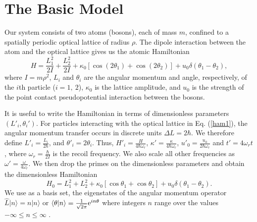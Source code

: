 \documentclass{article}
\begin{document}
%
%
\section{The Basic Model}
\label{sec:basicmodel}
%
%

Our system consists of two  atoms (bosons), each  of mass $m$, confined to a spatially periodic  optical lattice of radius $\rho$.  The dipole interaction between the atom and the optical lattice gives us the  atomic Hamiltonian
%
\begin{equation}
H=\frac{L_1^2}{2I}+\frac{L_2^2}{2I}+\kappa_0 [ \cos{(2{\theta}_1)} + \cos{(2{\theta}_2)}]+u_0 \delta({\theta}_1-{\theta}_2),
\label{ham1}
\end{equation}
%
where $I=m{\rho}^2$, $L_i$ and ${\theta}_i$ are the angular momentum and angle, respectively,  of the $i$th particle ($i=1,~2$), $\kappa_0$ is the lattice amplitude, and $u_0$ is the strength of the point contact pseudopotential interaction between the bosons. 

It is useful to write the Hamiltonian in terms of dimensionless parameters $(L'_i, {\theta}_i')$. For particles interacting with the optical lattice in Eq. (\ref{ham1}), the angular momentum transfer  occurs in discrete units ${\Delta}L=2{\hbar}$. We therefore define $L'_i=\frac{L_i}{2\hbar }$, and ${\theta}'_i=2 {\theta}_i$. Thus, $H'_i=\frac{H}{4\hbar\omega_r}$, $\kappa'=\frac{\kappa}{4\hbar\omega_r}$, $u'_0=\frac{u_0 }{2\hbar\omega_r}$ and $t'=4\omega_r t$, where $\omega_r=\frac{\hbar }{2I}$ is the recoil frequency. We also scale all other frequencies as $\omega'=\frac{\omega}{4\omega_r}$. We  then drop the primes on the dimensionless parameters and obtain the dimensionless Hamiltonian 
%
\begin{equation}
H_0=L^2_1 + L^2_2+\kappa_0 [ \cos{{\theta}_1}+ \cos{{\theta}_2}] + u_0 \delta({\theta}_1-{\theta}_2).
\label{eq:hamscale}
\end{equation}
%
We use as a basis set, the eigenstates of the angular momentum operator 
${\hat L}|n{\rangle}=n{|n \rangle}$ or ${\langle}{\theta}|n{\rangle}=\frac{1}{\sqrt{2\pi}}{\rm e}^{in{\theta}}$ where integers $n$ range over the values $-\infty{\leq}n{\leq}\infty$ . 
\end{document}
